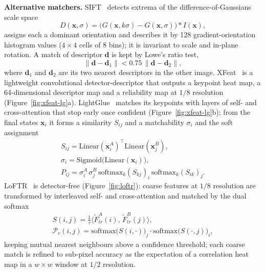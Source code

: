 \documentclass[journal]{IEEEtran}
\begin{document}
\textbf{Alternative matchers.} SIFT~\cite{sift} detects extrema of the difference-of-Gaussians scale space
\begin{equation}
  D(\mathbf{x},\sigma)=\big(G(\mathbf{x},k\sigma)-G(\mathbf{x},\sigma)\big)*I(\mathbf{x}),
\end{equation}
assigns each a dominant orientation and describes it by 128 gradient-orientation histogram values ($4\times4$ cells of 8 bins); it is invariant to scale and in-plane rotation. A match of descriptor $\mathbf{d}$ is kept by Lowe's ratio test,
\begin{equation}
  \|\mathbf{d}-\mathbf{d}_1\| < 0.75\,\|\mathbf{d}-\mathbf{d}_2\|,
\end{equation}
where $\mathbf{d}_1$ and $\mathbf{d}_2$ are its two nearest descriptors in the other image. XFeat~\cite{xfeat} is a lightweight convolutional detector-descriptor that outputs a keypoint heat map, a 64-dimensional descriptor map and a reliability map at $1/8$ resolution (Figure~\ref{fig:xfeat-lg}a). LightGlue~\cite{lightglue} matches its keypoints with layers of self- and cross-attention that stop early once confident (Figure~\ref{fig:xfeat-lg}b); from the final states $\mathbf{x}_i$ it forms a similarity $S_{ij}$ and a matchability $\sigma_i$ and the soft assignment
\begin{gather}
  S_{ij}=\mathrm{Linear}(\mathbf{x}^A_i)^\top\mathrm{Linear}(\mathbf{x}^B_j),\\
  \sigma_i=\mathrm{Sigmoid}\big(\mathrm{Linear}(\mathbf{x}_i)\big),\\
  P_{ij}=\sigma^A_i\,\sigma^B_j\,\mathrm{softmax}_k(S_{kj})_i\,\mathrm{softmax}_k(S_{ik})_j .
\end{gather}
LoFTR~\cite{loftr} is detector-free (Figure~\ref{fig:loftr}): coarse features at $1/8$ resolution are transformed by interleaved self- and cross-attention and matched by the dual softmax
\begin{gather}
  S(i,j)=\tfrac{1}{\tau}\big\langle\tilde F^A_{tr}(i),\,\tilde F^B_{tr}(j)\big\rangle,\\
  \mathcal P_c(i,j)=\mathrm{softmax}\big(S(i,\cdot)\big)_j\cdot\mathrm{softmax}\big(S(\cdot,j)\big)_i ,
\end{gather}
keeping mutual nearest neighbours above a confidence threshold; each coarse match is refined to sub-pixel accuracy as the expectation of a correlation heat map in a $w\times w$ window at $1/2$ resolution.
\end{document}
